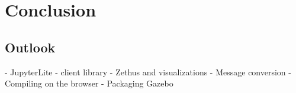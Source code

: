 \chapter{Conclusion}

\section{Outlook}

- JupyterLite
- client library
- Zethus and visualizations
- Message conversion
- Compiling on the browser
- Packaging Gazebo